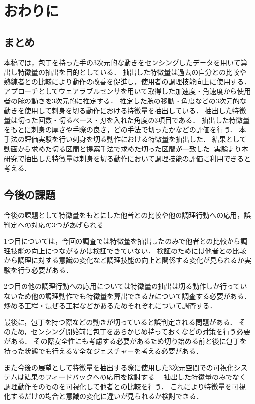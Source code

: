 \chapter{おわりに}
\section{まとめ}
本稿では，包丁を持った手の3次元的な動きをセンシングしたデータを用いて算出し特徴量の抽出を目的としている．
抽出した特徴量は過去の自分との比較や熟練者との比較により動作の改善を促進し，使用者の調理技能向上に使用する．
アプローチとしてウェアラブルセンサを用いて取得した加速度・角速度から使用者の腕の動きを3次元的に推定する．
推定した腕の移動・角度などの3次元的な動きを使用して刺身を切る動作における特徴量を抽出している．
抽出した特徴量は切った回数・切るペース・刃を入れた角度の3項目である．
抽出した特徴量をもとに刺身の厚さや手際の良さ，どの手法で切ったかなどの評価を行う．
本手法の評価実験を行い刺身を切る動作における特徴量を抽出した．
結果として動画から求めた切る区間と提案手法で求めた切った区間が一致した.
実験より本研究で抽出した特徴量は刺身を切る動作において調理技能の評価に利用できると考える．

\section{今後の課題}
今後の課題として特徴量をもとにした他者との比較や他の調理行動への応用，誤判定への対応の3つがあげられる．

1つ目については，今回の調査では特徴量を抽出したのみで他者との比較から調理技能の向上につながるかは検証できていない．
検証のためには他者との比較から調理に対する意識の変化など調理技能の向上と関係する変化が見られるか実験を行う必要がある．

2つ目の他の調理行動への応用については特徴量の抽出は切る動作しか行っていないため他の調理動作でも特徴量を算出できるかについて調査する必要がある．
炒める工程・混ぜる工程などがあるためそれぞれについて調査する．

最後に，包丁を持つ際などの動きが切っていると誤判定される問題がある．
そのため，センシング開始前に包丁をあらかじめ持っておくなどの対策を行う必要がある．
その際安全性にも考慮する必要があるため切り始める前と後に包丁を持った状態でも行える安全なジェスチャーを考える必要がある．

また今後の展望として特徴量を抽出する際に使用した3次元空間での可視化システムは結果のフィードバックへの応用を検討する．
抽出した特徴量のみでなく調理動作そのものを可視化して他者との比較を行う．
これにより特徴量を可視化するだけの場合と意識の変化に違いが見られるか検討できる．